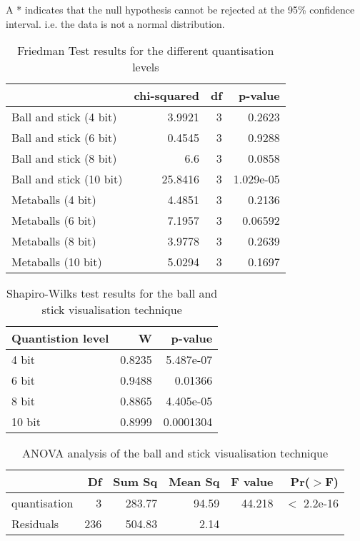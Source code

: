 A * indicates that the null hypothesis cannot be rejected at the 95\%
confidence interval. i.e. the data is not a normal distribution.


\begin{table}[h!]
  \begin{tabular}{ | l | r | r | r | }
  \hline
                          & chi-squared & df &    p-value  \\ \hline
  Ball and stick (4 bit)  &      3.9921 &  3 &     0.2623  \\ \hline
  Ball and stick (6 bit)  &      0.4545 &  3 &     0.9288  \\ \hline
  Ball and stick (8 bit)  &         6.6 &  3 &     0.0858  \\ \hline
  Ball and stick (10 bit) &     25.8416 &  3 &  1.029e-05  \\ \hline
  Metaballs (4 bit)       &      4.4851 &  3 &     0.2136  \\ \hline
  Metaballs (6 bit)       &      7.1957 &  3 &    0.06592  \\ \hline
  Metaballs (8 bit)       &      3.9778 &  3 &     0.2639  \\ \hline
  Metaballs (10 bit)      &      5.0294 &  3 &     0.1697  \\ \hline
  \end{tabular}
  \caption{Friedman Test results for the different quantisation levels}
  \label{tab:friedman_test_results}
\end{table}


\begin{table}[h!]
  \begin{tabular}{ | l | r | r | }
  \hline
  Quantistion level &      W &   p-value  \\ \hline
  4 bit             & 0.8235 & 5.487e-07  \\ \hline
  6 bit             & 0.9488 &   0.01366  \\ \hline
  8 bit             & 0.8865 & 4.405e-05  \\ \hline
  10 bit            & 0.8999 & 0.0001304  \\ \hline
  \end{tabular}
  \caption{Shapiro-Wilks test results for the ball and stick visualisation
  technique}
  \label{tab:ballstick_normality}
\end{table}


\begin{table}[h!]
  \begin{tabular}{ | l | r | r | r | r | r | }
  \hline
               &  Df & Sum Sq & Mean Sq & F value &   Pr($>$F)   \\ \hline
  quantisation &   3 & 283.77 &   94.59 &  44.218 & $<$ 2.2e-16  \\ \hline
  Residuals    & 236 & 504.83 &    2.14 &         &              \\ \hline
  \end{tabular}
  \caption{ANOVA analysis of the ball and stick visualisation technique}
  \label{tab:ballstick_anova}
\end{table}


